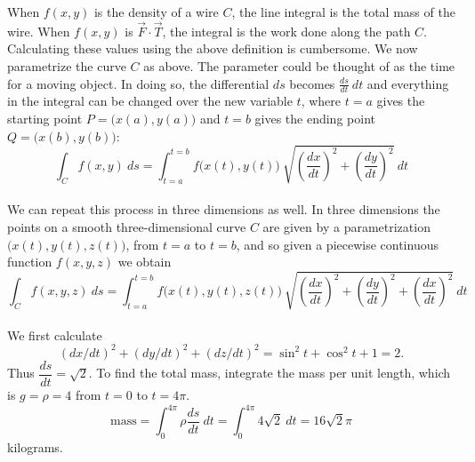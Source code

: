 When $f(x,y)$ is the density of a wire $C$, the line integral is the total mass of the wire. When $f(x,y)$ is $\vec F \cdot \vec T$, the integral is the work done along the path $C$. Calculating these values using the above definition is cumbersome. We now parametrize the curve $C$ as above.  The parameter could be thought of as the time for a moving object.  In doing so, the differential $ds$ becomes $\frac{ds}{dt} \: dt$ and everything in the integral can be changed over the new variable $t$, where $t = a$ gives the starting point $P = \big(x(a),y(a)\big)$ and $t = b$ gives the ending point $Q = \big(x(b),y(b)\big)$:
$$\int_C f(x,y) \: ds = \int_{t=a}^{t=b} f\big(x(t),y(t)\big) \: \sqrt{\left(\dfrac{dx}{dt}\right)^2+\left(\dfrac{dy}{dt}\right)^2} \: dt$$\\

We can repeat this process in three dimensions as well. In three dimensions the points on a smooth three-dimensional curve $C$ are given by a parametrization $\big(x(t), y(t), z(t)\big)$, from $t = a$ to $t = b$, and so given a piecewise continuous function $f(x,y,z)$ we obtain
$$\int_C f(x,y,z) \: ds = \int_{t=a}^{t=b} f\big(x(t),y(t),z(t)\big) \: \sqrt{\left(\dfrac{dx}{dt}\right)^2+\left(\dfrac{dy}{dt}\right)^2 + \left(\dfrac{dx}{dt}\right)^2} \: dt$$\\


{We first calculate 
$$(dx/dt)^2 + (dy/dt)^2 + (dz/dt)^2 = \sin^2 t + \cos^2 t + 1 = 2.$$ Thus
$\dfrac{ds}{dt} = \sqrt{2}$. To find the total mass, integrate the mass per unit length, which is $g = \rho = 4$ from $t = 0$ to $t = 4\pi$.
$$\text{mass}=\int_0^{4\pi} \rho \dfrac{ds}{dt} \: dt = \int_0^{4\pi}4\sqrt{2}\: dt = 16\sqrt{2}\pi$$
kilograms.}\\

\\




